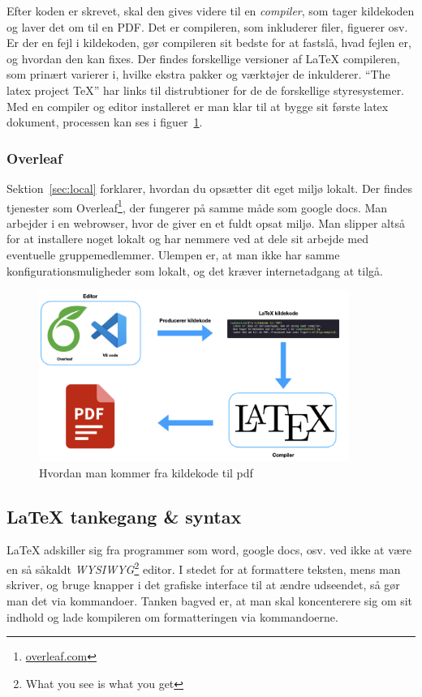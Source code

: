 \documentclass{article}
\begin{document}
   Efter koden er skrevet, skal den gives videre til en \emph{compiler}, som
   tager kildekoden og laver det om til en PDF. Det er compileren, som
   inkluderer filer, figuerer osv. Er der en fejl i kildekoden, gør compileren
   sit bedste for at fastslå, hvad fejlen er, og hvordan den kan fixes. Der findes
   forskellige versioner af LaTeX compileren, som prinært varierer i, hvilke
   ekstra pakker og værktøjer de inkulderer.
   ``The latex project TeX''\cite{texLive} har links til distrubtioner for de
   de forskellige styresystemer. Med en compiler og editor installeret er man
   klar til at bygge sit første latex dokument, processen kan ses i
   figuer~\ref{fig:compile}.

   \subsubsection{Overleaf}
     Sektion~\ref{sec:local} forklarer, hvordan du opsætter dit eget miljø lokalt.
     Der findes tjenester som Overleaf\footnote{\url{overleaf.com}}, der fungerer
     på samme måde som google docs. Man arbejder i en webrowser, hvor de giver en et fuldt opsat
     miljø. Man slipper altså for at installere noget lokalt og har nemmere ved
     at dele sit arbejde med eventuelle gruppemedlemmer. Ulempen er, at man ikke
     har samme konfigurationsmuligheder som lokalt, og det kræver internetadgang
     at tilgå.

     \begin{figure}[h]
       \centering\includegraphics[width=0.9\textwidth]{assets/compile.png}
       \caption{Hvordan man kommer fra kildekode til pdf}\label{fig:compile}
     \end{figure}


 \subsection{\LaTeX{} tankegang \& syntax}
   \LaTeX{} adskiller sig fra programmer som word, google docs, osv. ved ikke at
   være en så såkaldt \emph{WYSIWYG}\footnote{What you see is what you get} editor.
   I stedet for at formattere teksten, mens man skriver, og bruge knapper i det grafiske
   interface til at ændre udseendet, så gør man det via kommandoer. Tanken bagved er, at man
   skal koncenterere sig om sit indhold og lade kompileren om formatteringen via
   kommandoerne.
\end{document}
